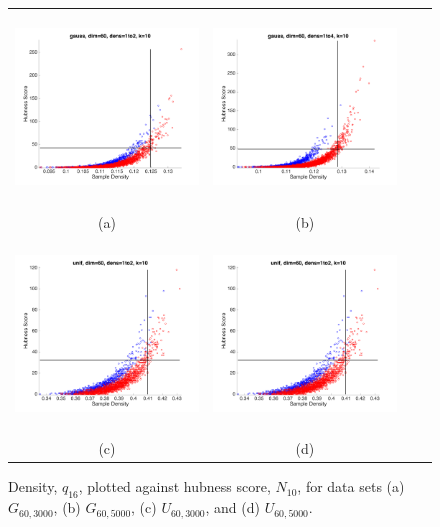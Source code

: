 \documentclass[graybox]{svmult}
\begin{document}
\begin{figure}
\centering
    \begin{tabular}{cccc}
        \includegraphics[width=2.5in,height=2in]{../fig/gauss-dim60-1to2-k10-GlobDensGlobHubs.png} &
        \includegraphics[width=2.5in,height=2in]{../fig/gauss-dim60-1to4-k10-GlobDensGlobHubs.png} \\
        {\scriptsize (a)} &  {\scriptsize (b)} \\
        \includegraphics[width=2.5in,height=2in]{../fig/unif-dim60-1to2-k10-GlobDensGlobHubs.png}&
        \includegraphics[width=2.5in,height=2in]{../fig/unif-dim60-1to2-k10-GlobDensGlobHubs.png}\\
        {\scriptsize (c)} &  {\scriptsize (d)} 
      \end{tabular}
      \caption{Density, $q_{16}$, plotted against hubness score, $N_{10}$, for data sets (a) $G_{60,3000}$, (b) $G_{60,5000}$, (c) $U_{60,3000}$, and (d) $U_{60,5000}$.}\label{fig:GlobDensHubs}
\end{figure}
\end{document}
